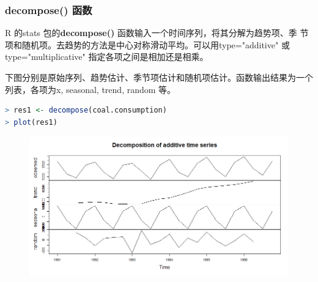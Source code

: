 \documentclass[11pt,a4paper,oneside]{book}
\begin{document}
\subsubsection{decompose() 函数}
R 的stats 包的\textbf{decompose()} 函数输入一个时间序列，将其分解为趋势项、季
节项和随机项。去趋势的方法是中心对称滑动平均。可以用type="additive"
或type="multiplicative" 指定各项之间是相加还是相乘。

下图分别是原始序列、趋势估计、季节项估计和随机项估计。函数输出结果为一个
列表，各项为x, seasonal, trend, random 等。
\begin{lstlisting}[language=r]
> res1 <- decompose(coal.consumption)
> plot(res1)
\end{lstlisting}
\begin{figure}[H]
	\centering
	\includegraphics[width=\textwidth]{9.png}
\end{figure}
\end{document}
